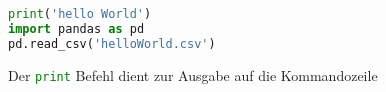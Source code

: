 \documentclass[12pt,ngerman,parskip=half]{scrartcl}
\begin{document}
\begin{lstlisting}[language={Python},morekeywords={read_csv}]
print('hello World')
import pandas as pd
pd.read_csv('helloWorld.csv')
\end{lstlisting}

Der \lstinline[language={Python}]{print} Befehl dient zur Ausgabe auf die Kommandozeile


\end{document}
